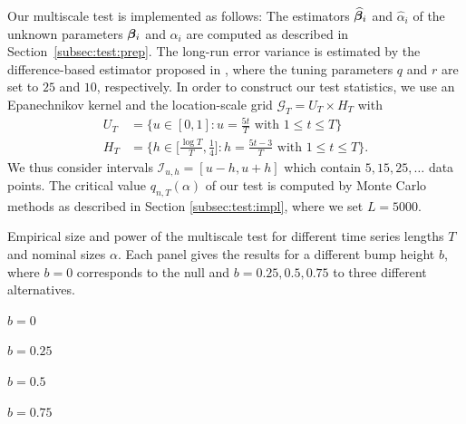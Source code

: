 \documentclass[12pt]{article}
\begin{document}
Our multiscale test is implemented as follows: The estimators $\widehat{\bm{\beta}}_i$ and $\widehat{\alpha}_i$ of the unknown parameters $\bm{\beta}_i$ and $\alpha_i$ are computed as described in Section~\ref{subsec:test:prep}.
The long-run error variance is estimated by the difference-based estimator proposed in \cite{KhismatullinaVogt2020}, where the tuning parameters $q$ and $r$ are set to $25$ and $10$, respectively.
In order to construct our test statistics, we use an Epanechnikov kernel and the location-scale grid $\mathcal{G}_T = U_T \times H_T$ with
\begin{align}
U_T & = \big\{ u \in [0,1]: u = \textstyle{\frac{5t}{T}} \text{ with } 1 \le t \le T \big\} \label{eq:grid-loc} \\
H_T & = \big\{ h \in \big[ \textstyle{\frac{\log T}{T}}, \textstyle{\frac{1}{4}} \big]:  h = \textstyle{\frac{5 t -3}{T}} \text{ with } 1 \le t \le T \big\}. \label{eq:grid-scale}
\end{align}
We thus consider intervals $\mathcal{I}_{u, h} = [u-h, u+h]$ which contain $5, 15, 25, \ldots$ data points. The critical value $q_{n,T}(\alpha)$ of our test is computed by Monte Carlo methods as described in Section \ref{subsec:test:impl}, where we set $L=5000$. 


\begin{table}[t!]
\renewcommand{\arraystretch}{1.2}  
\footnotesize{
\begin{center}
\caption{Empirical size and power of the multiscale test for different time series lengths $T$ and nominal sizes $\alpha$.
Each panel gives the results for a different bump height $b$, where $b = 0$ corresponds to the null and $b = 0.25,0.5,0.75$ to three different alternatives.}\label{tab:sizepower}
\begin{subtable}[b]{0.4\textwidth}
\centering  
\caption{$b=0$}

\end{subtable}
\begin{subtable}[b]{0.4\textwidth}
\centering  
\caption{$b=0.25$}

\end{subtable}
\begin{subtable}[b]{0.4\textwidth}
\centering  
\vspace{0.25cm} \caption{$b=0.5$}

\end{subtable}
\begin{subtable}[b]{0.4\textwidth}
\centering  
\vspace{0.25cm} \caption{$b=0.75$}

\end{subtable}
\end{center}}
\end{table}
\end{document}
